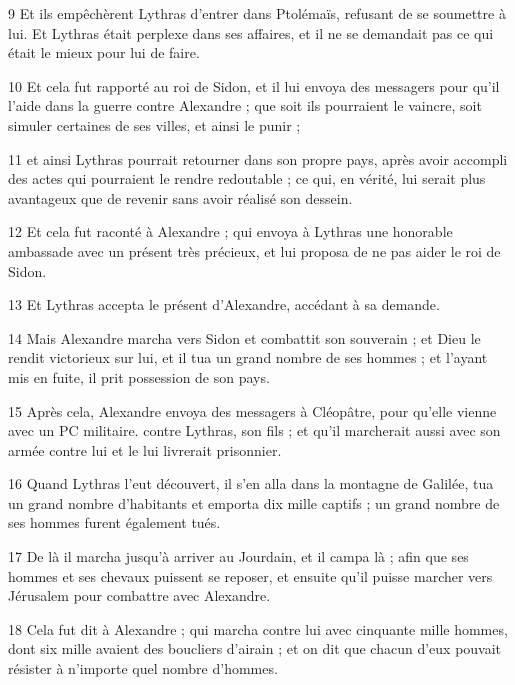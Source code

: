 \par 9 Et ils empêchèrent Lythras d'entrer dans Ptolémaïs, refusant de se soumettre à lui. Et Lythras était perplexe dans ses affaires, et il ne se demandait pas ce qui était le mieux pour lui de faire.

\par 10 Et cela fut rapporté au roi de Sidon, et il lui envoya des messagers pour qu'il l'aide dans la guerre contre Alexandre ; que soit ils pourraient le vaincre, soit simuler certaines de ses villes, et ainsi le punir ;

\par 11 et ainsi Lythras pourrait retourner dans son propre pays, après avoir accompli des actes qui pourraient le rendre redoutable ; ce qui, en vérité, lui serait plus avantageux que de revenir sans avoir réalisé son dessein.

\par 12 Et cela fut raconté à Alexandre ; qui envoya à Lythras une honorable ambassade avec un présent très précieux, et lui proposa de ne pas aider le roi de Sidon.

\par 13 Et Lythras accepta le présent d'Alexandre, accédant à sa demande.

\par 14 Mais Alexandre marcha vers Sidon et combattit son souverain ; et Dieu le rendit victorieux sur lui, et il tua un grand nombre de ses hommes ; et l'ayant mis en fuite, il prit possession de son pays.

\par 15 Après cela, Alexandre envoya des messagers à Cléopâtre, pour qu'elle vienne avec un PC militaire. contre Lythras, son fils ; et qu'il marcherait aussi avec son armée contre lui et le lui livrerait prisonnier.

\par 16 Quand Lythras l'eut découvert, il s'en alla dans la montagne de Galilée, tua un grand nombre d'habitants et emporta dix mille captifs ; un grand nombre de ses hommes furent également tués.

\par 17 De là il marcha jusqu'à arriver au Jourdain, et il campa là ; afin que ses hommes et ses chevaux puissent se reposer, et ensuite qu'il puisse marcher vers Jérusalem pour combattre avec Alexandre.

\par 18 Cela fut dit à Alexandre ; qui marcha contre lui avec cinquante mille hommes, dont six mille avaient des boucliers d'airain ; et on dit que chacun d'eux pouvait résister à n'importe quel nombre d'hommes.

